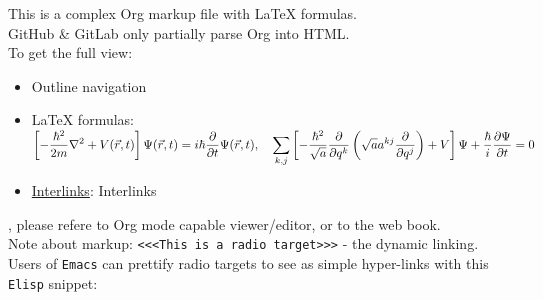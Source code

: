 \documentclass[a4paper,14pt,oneside]{book}
\begin{document}
This is a complex Org markup file with \LaTeX{} formulas.\\
GitHub \& GitLab only partially parse Org into HTML.\\

To get the full view:\\
\begin{itemize}
\item Outline navigation\\
\item \LaTeX{} formulas: \({\displaystyle\left[{-\frac{\hbar^{2}}{2m}}\nabla^{2}+V(\vec{r},t)\right]\Psi({\vec{r}},t)=i\hbar{\partial\over\partial{t}}\Psi({\vec{r}},t),\quad\sum_{k,j}\left[-{\frac{\hbar^{2}}{\sqrt{a}}}{\frac{\partial}{\partial{q^{k}}}}\left({\sqrt{a}}a^{kj}{\frac{\partial}{\partial{q^{j}}}}\right)+V\right]\Psi+{\frac{\hbar}{i}}{\frac{\partial{\Psi}}{\partial{t}}}=0}\)\\
\item \hyperref[orgd745462]{Interlinks}: \label{orgd745462}Interlinks\\
\end{itemize}

, please refere to Org mode capable viewer/editor, or to the web book.\\

Note about markup: \texttt{<<<This is a radio target>>>} - the dynamic linking.\\

Users of \texttt{Emacs} can prettify radio targets to see as simple hyper-links with this \texttt{Elisp} snippet:\\
\end{document}
